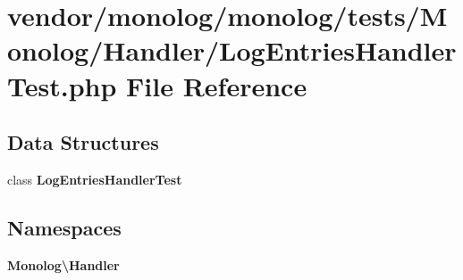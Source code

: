 \section{vendor/monolog/monolog/tests/\+Monolog/\+Handler/\+Log\+Entries\+Handler\+Test.php File Reference}
\label{_log_entries_handler_test_8php}
\subsection*{Data Structures}
\begin{DoxyCompactItemize}
\item 
class {\bf Log\+Entries\+Handler\+Test}
\end{DoxyCompactItemize}
\subsection*{Namespaces}
\begin{DoxyCompactItemize}
\item 
 {\bf Monolog\textbackslash{}\+Handler}
\end{DoxyCompactItemize}
